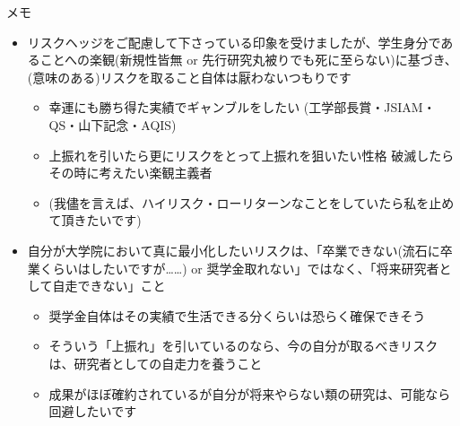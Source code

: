 \documentclass[13pt,aspectratio=169,table,dvipdfmx]{beamer}
\begin{document}
    \begin{frame}{\LARGE{メモ}}
        \begin{itemize}
            \item リスクヘッジをご配慮して下さっている印象を受けましたが、学生身分であることへの楽観(新規性皆無 or 先行研究丸被りでも死に至らない)に基づき、(意味のある)リスクを取ること自体は厭わないつもりです
                  \begin{itemize}
                      \item 幸運にも勝ち得た実績でギャンブルをしたい (工学部長賞・JSIAM・QS・山下記念・AQIS)
                      \item 上振れを引いたら更にリスクをとって上振れを狙いたい性格 破滅したらその時に考えたい楽観主義者
                      \item (我儘を言えば、ハイリスク・ローリターンなことをしていたら私を止めて頂きたいです)
                  \end{itemize}
            \item 自分が大学院において真に最小化したいリスクは、「卒業できない(流石に卒業くらいはしたいですが……) or 奨学金取れない」ではなく、「将来研究者として自走できない」こと
                  \begin{itemize}
                      \item 奨学金自体はその実績で生活できる分くらいは恐らく確保できそう
                      \item そういう「上振れ」を引いているのなら、今の自分が取るべきリスクは、研究者としての自走力を養うこと
                      \item 成果がほぼ確約されているが自分が将来やらない類の研究は、可能なら回避したいです
                  \end{itemize}
        \end{itemize}
    \end{frame}
\fi
\end{document}
